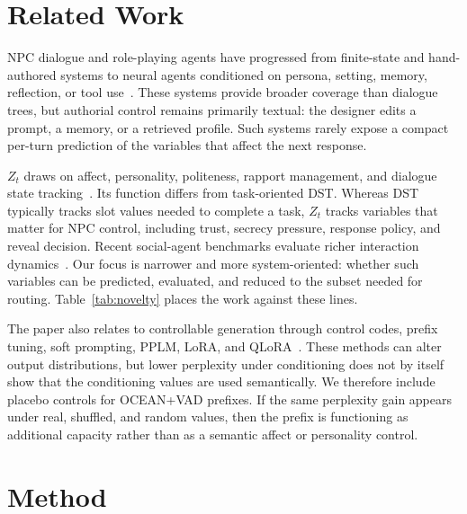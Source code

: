 \documentclass[11pt]{article}
\begin{document}
\section{Related Work}
\label{sec:related}

NPC dialogue and role-playing agents have progressed from finite-state and hand-authored systems to neural agents conditioned on persona, setting, memory, reflection, or tool use~\cite{bordes2017learning,zhang2018personalizing,urbanek2019learning,park2023generative,wang2023voyager,shao2023character,wang2024rolellm,li2023chatharuhi}. These systems provide broader coverage than dialogue trees, but authorial control remains primarily textual: the designer edits a prompt, a memory, or a retrieved profile. Such systems rarely expose a compact per-turn prediction of the variables that affect the next response.

$Z_t$ draws on affect, personality, politeness, rapport management, and dialogue state tracking~\cite{russell1980circumplex,oatley1987towards,digman1990personality,brown1987politeness,spencer2008politeness,mrksic2017neural}. Its function differs from task-oriented DST. Whereas DST typically tracks slot values needed to complete a task, $Z_t$ tracks variables that matter for NPC control, including trust, secrecy pressure, response policy, and reveal decision. Recent social-agent benchmarks evaluate richer interaction dynamics~\cite{zhou2024sotopia,zhou2025social,sage2025steering}. Our focus is narrower and more system-oriented: whether such variables can be predicted, evaluated, and reduced to the subset needed for routing. Table~\ref{tab:novelty} places the work against these lines.

The paper also relates to controllable generation through control codes, prefix tuning, soft prompting, PPLM, LoRA, and QLoRA~\cite{keskar2019ctrl,li2021prefix,lester2021power,dathathri2020plug,hu2021lora,dettmers2023qlora}. These methods can alter output distributions, but lower perplexity under conditioning does not by itself show that the conditioning values are used semantically. We therefore include placebo controls for OCEAN+VAD prefixes. If the same perplexity gain appears under real, shuffled, and random values, then the prefix is functioning as additional capacity rather than as a semantic affect or personality control.

\section{Method}
\label{sec:method}
\end{document}
